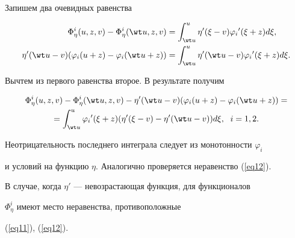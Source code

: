 \begin{pf} Запишем два очевидных равенства


\begin{align*}


\Phi_{\eta}^{i}(u,z,v)-\Phi_{\eta}^{i}(\wt u,z,v)&=\int_{\wt u}^{u}


{\eta}'(\xi-v) {\varphi_{i}}' (\xi+z) d \xi, \\


%


{\eta}' (\wt u-v)(\varphi_{i}(u+z)-\varphi_{i}(\wt u+z)) &= 


\int_{\wt u}^{u}{\eta}'(\wt u-v) {\varphi_{i}}' (\xi+z) d \xi.


\end{align*}


Вычтем из первого равенства второе. В результате получим


\begin{multline*}


\Phi_{\eta}^{i}(u,z,v)-\Phi_{\eta}^{i}(\wt u,z,v)-


{\eta}' (\wt u-v)(\varphi_{i}(u+z)-\varphi_{i}(\wt u+z)) = \\


%


= \int_{\wt u}^{u}{\varphi_{i}}' (\xi+ z) ({\eta}' (\xi-v)-


{\eta}' (\wt u-v)) d \xi, \ \; i=1,2. 


\end{multline*}


Неотрицательность последнего интеграла следует из монотонности $\varphi_{i}$ 


и условий на функцию $\eta$. Аналогично проверяется неравенство (\ref{eq12}).


\end{pf}





\begin{notenonum} \label{N1}


В случае, когда $\eta '$ --- невозрастающая функция, для функционалов 


$\Phi^{i}_{\eta}$ имеют место неравенства, противоположные


(\ref{eq11}), (\ref{eq12}). 


\end{notenonum}





